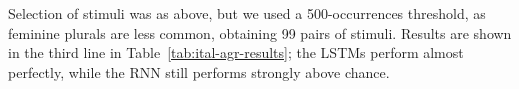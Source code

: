 Selection of stimuli was as above, but we used a 500-occurrences
threshold, as feminine plurals are less common, obtaining 99 pairs of stimuli. %
Results are shown in the third line in Table~\ref{tab:ital-agr-results}; the LSTMs perform almost perfectly, while the RNN still performs strongly above chance.

